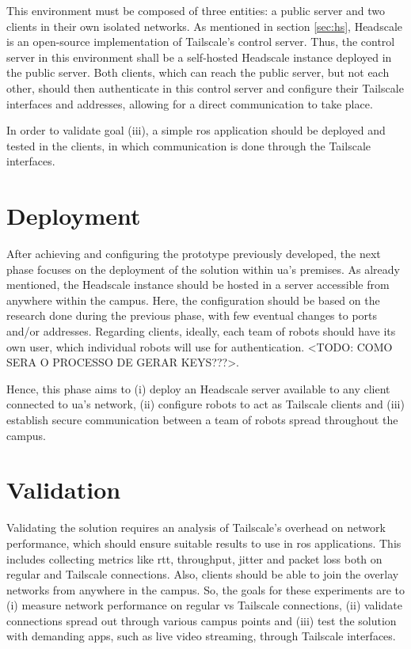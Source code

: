 \documentclass[11pt,twoside,a4paper]{report}
\begin{document}
This environment must be composed of three entities: a public server and two clients in their own isolated networks. As mentioned in section \ref{sec:hs}, Headscale is an open-source implementation of Tailscale's control server. Thus, the control server in this environment shall be a self-hosted Headscale instance deployed in the public server. Both clients, which can reach the public server, but not each other, should then authenticate in this control server and configure their Tailscale interfaces and addresses, allowing for a direct communication to take place.

In order to validate goal (iii), a simple \ac{ros} application should be deployed and tested in the clients, in which communication is done through the Tailscale interfaces.

\section{Deployment}

After achieving and configuring the prototype previously developed, the next phase focuses on the deployment of the solution within \ac{ua}'s premises. As already mentioned, the Headscale instance should be hosted in a server accessible from anywhere within the campus. Here, the configuration should be based on the research done during the previous phase, with few eventual changes to ports and/or addresses. Regarding clients, ideally, each team of robots should have its own user, which individual robots will use for authentication. <TODO: COMO SERA O PROCESSO DE GERAR KEYS???>.

Hence, this phase aims to (i) deploy an Headscale server available to any client connected to \ac{ua}'s network, (ii) configure robots to act as Tailscale clients and (iii) establish secure communication between a team of robots spread throughout the campus.


\section{Validation}
\label{sec:metvalidation}

Validating the solution requires an analysis of Tailscale's overhead on  network performance, which should ensure suitable results to use in \ac{ros} applications. This includes collecting metrics like \ac{rtt}, throughput, jitter and packet loss both on regular and Tailscale connections. Also, clients should be able to join the overlay networks from anywhere in the campus. So, the goals for these experiments are to (i) measure network performance on regular vs Tailscale connections, (ii) validate connections spread out through various campus points and (iii) test the solution with demanding apps, such as live video streaming, through Tailscale interfaces.
\end{document}
